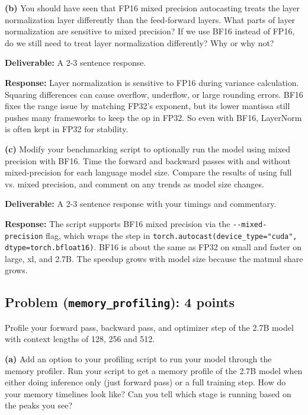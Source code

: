 \documentclass[11pt]{article}
\begin{document}
\textbf{(b)} You should have seen that FP16 mixed precision autocasting treats the layer normalization layer differently than the feed-forward layers. What parts of layer normalization are sensitive to mixed precision? If we use BF16 instead of FP16, do we still need to treat layer normalization differently? Why or why not?

\textbf{Deliverable:} A 2-3 sentence response.

\vspace{0.25cm}
\textbf{Response:}
Layer normalization is sensitive to FP16 during variance calculation. Squaring differences can cause overflow, underflow, or large rounding errors. BF16 fixes the range issue by matching FP32's exponent, but its lower mantissa still pushes many frameworks to keep the op in FP32. So even with BF16, LayerNorm is often kept in FP32 for stability.

\vspace{0.25cm}
\textbf{(c)} Modify your benchmarking script to optionally run the model using mixed precision with BF16. Time the forward and backward passes with and without mixed-precision for each language model size. Compare the results of using full vs. mixed precision, and comment on any trends as model size changes.

\textbf{Deliverable:} A 2-3 sentence response with your timings and commentary.

\vspace{0.25cm}
\textbf{Response:}
The script supports BF16 mixed precision via the \verb|--mixed-precision| flag, which wraps the step in \verb|torch.autocast(device_type="cuda", dtype=torch.bfloat16)|. BF16 is about the same as FP32 on small and faster on large, xl, and 2.7B. The speedup grows with model size because the matmul share grows.

\subsection*{Problem (\texttt{memory\_profiling}): 4 points}

Profile your forward pass, backward pass, and optimizer step of the 2.7B model with context lengths of 128, 256 and 512.

\textbf{(a)} Add an option to your profiling script to run your model through the memory profiler. Run your script to get a memory profile of the 2.7B model when either doing inference only (just forward pass) or a full training step. How do your memory timelines look like? Can you tell which stage is running based on the peaks you see?
\end{document}
